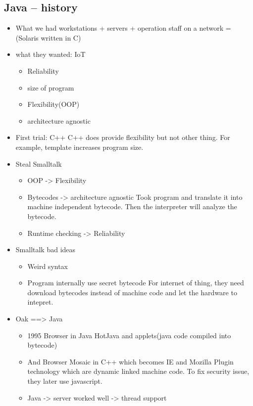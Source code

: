 \documentclass[11pt]{article}
\begin{document}
\subsection{Java -- history}
\label{sec:orgd925bc5}
\begin{itemize}
\item What we had
workstations + servers + operation staff on a network = (Solaris written in
C)
\item what they wanted: IoT
\begin{itemize}
\item Reliability
\item size of program
\item Flexibility(OOP)
\item architecture agnostic
\end{itemize}

\item First trial: C++
C++ does provide flexibility but not other thing. For example, template
increases program size.

\item Steal Smalltalk
\begin{itemize}
\item OOP -> Flexibility
\item Bytecodes -> architecture agnostic
Took program and translate it into machine independent bytecode. Then the
interpreter will analyze the bytecode.
\item Runtime checking -> Reliability
\end{itemize}

\item Smalltalk bad ideas
\begin{itemize}
\item Weird syntax
\item Program internally use secret bytecode
For internet of thing, they need download bytecodes instead of machine
code and let the hardware to intepret.
\end{itemize}

\item Oak ==> Java
\begin{itemize}
\item 1995 Browser in Java
HotJava and applets(java code compiled into bytecode)
\item And Browser Mosaic in C++
which becomes IE and Mozilla
Plugin technology which are dynamic linked machine code.
To fix security issue, they later use javascript.
\item Java -> server worked well
-> thread support
\end{itemize}
\end{itemize}
\end{document}
